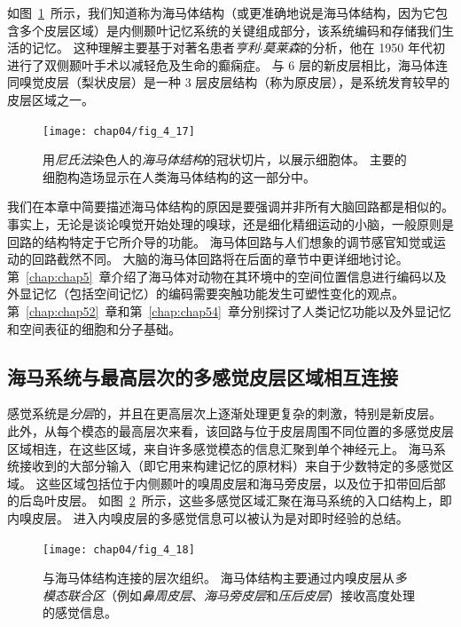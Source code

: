 如图~\ref{fig:4_17}~所示，我们知道称为海马体结构（或更准确地说是海马体结构，因为它包含多个皮层区域）是内侧颞叶记忆系统的关键组成部分，该系统编码和存储我们生活的记忆。 
这种理解主要基于对著名患者\textit{亨利$\cdot$莫莱森}的分析，他在 1950 年代初进行了双侧颞叶手术以减轻危及生命的癫痫症。
与 6 层的新皮层相比，海马体连同嗅觉皮层（梨状皮层）是一种 3 层皮层结构（称为原皮层），是系统发育较早的皮层区域之一。


\begin{figure}[htbp]
	\centering
	\texttt{[image: chap04/fig\_4\_17]}
	\caption{用\textit{尼氏法}染色人的\textit{海马体结构}的冠状切片，以展示细胞体。
		主要的细胞构造场显示在人类海马体结构的这一部分中。}
	\label{fig:4_17}
\end{figure}


我们在本章中简要描述海马体结构的原因是要强调并非所有大脑回路都是相似的。
事实上，无论是谈论嗅觉开始处理的嗅球，还是细化精细运动的小脑，一般原则是回路的结构特定于它所介导的功能。
海马体回路与人们想象的调节感官知觉或运动的回路截然不同。
大脑的海马体回路将在后面的章节中更详细地讨论。 
第~\ref{chap:chap5}~章介绍了海马体对动物在其环境中的空间位置信息进行编码以及外显记忆（包括空间记忆）的编码需要突触功能发生可塑性变化的观点。 
第~\ref{chap:chap52}~章和第~\ref{chap:chap54}~章分别探讨了人类记忆功能以及外显记忆和空间表征的细胞和分子基础。



\subsection{海马系统与最高层次的多感觉皮层区域相互连接}

感觉系统是\textit{分层}的，并且在更高层次上逐渐处理更复杂的刺激，特别是新皮层。
此外，从每个模态的最高层次来看，该回路与位于皮层周围不同位置的多感觉皮层区域相连，在这些区域，来自许多感觉模态的信息汇聚到单个神经元上。
海马系统接收到的大部分输入（即它用来构建记忆的原材料）来自于少数特定的多感觉区域。
这些区域包括位于内侧颞叶的嗅周皮层和海马旁皮层，以及位于扣带回后部的后岛叶皮层。
如图~\ref{fig:4_18}~所示，这些多感觉区域汇聚在海马系统的入口结构上，即内嗅皮层。 
进入内嗅皮层的多感觉信息可以被认为是对即时经验的总结。


\begin{figure}[htbp]
	\centering
	\texttt{[image: chap04/fig\_4\_18]}
	\caption{与海马体结构连接的层次组织。
		海马体结构主要通过内嗅皮层从\textit{多模态联合区}（例如\textit{鼻周皮层}、\textit{海马旁皮层}和\textit{压后皮层}）接收高度处理的感觉信息。}
	\label{fig:4_18}
\end{figure}



